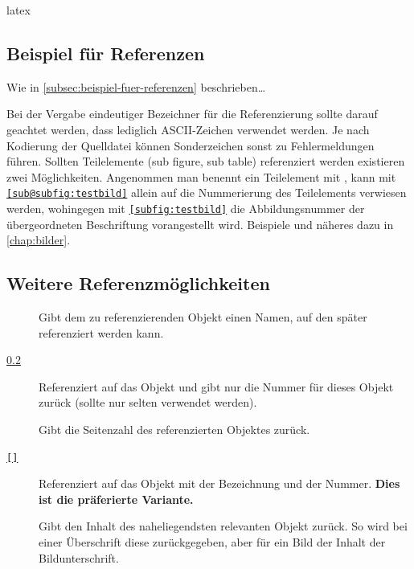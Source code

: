 \begin{showcode}{latex}
    \subsection{Beispiel für Referenzen}
    \label{subsec:beispiel-fuer-referenzen}

    Wie in \autoref{subsec:beispiel-fuer-referenzen} beschrieben…
\end{showcode}

Bei der Vergabe eindeutiger Bezeichner für die Referenzierung sollte darauf geachtet werden, dass lediglich ASCII-Zeichen verwendet werden. Je nach Kodierung der Quelldatei können Sonderzeichen sonst zu Fehlermeldungen führen. Sollten Teilelemente (sub figure, sub table) referenziert werden existieren zwei Möglichkeiten. Angenommen man benennt ein Teilelement mit \texttt{\label{subfig:testbild}}, kann mit \texttt{\autoref{sub@subfig:testbild}} allein auf die Nummerierung des Teilelements verwiesen werden, wohingegen mit \texttt{\autoref{subfig:testbild}} die Abbildungsnummer der übergeordneten Beschriftung vorangestellt wird. Beispiele und näheres dazu in \autoref{chap:bilder}.

\subsection{Weitere Referenzmöglichkeiten}

\begin{description}
    \item[\texttt{\label{}}] Gibt dem zu referenzierenden Objekt einen Namen, auf den später referenziert werden kann.
    \item[\texttt{\ref{}}] Referenziert auf das Objekt und gibt nur die Nummer für dieses Objekt zurück (sollte nur selten verwendet werden).
    \item[\texttt{\pageref{}}] Gibt die Seitenzahl des referenzierten Objektes zurück.
    \item[\texttt{\autoref{}}]\label{itm:autoref} Referenziert auf das Objekt mit der Bezeichnung und der Nummer. \textbf{Dies ist die präferierte Variante.}
    \item[\texttt{\nameref{}}] Gibt den Inhalt des naheliegendsten relevanten Objekt zurück. So wird bei einer Überschrift diese zurückgegeben, aber für ein Bild der Inhalt der Bildunterschrift.
\end{description}

